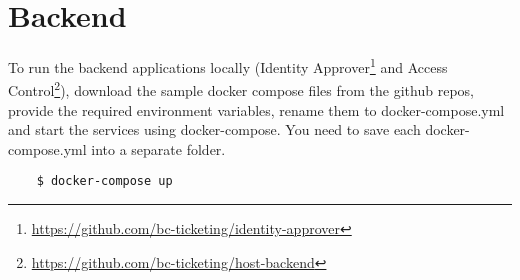 \section{Backend}
To run the backend applications locally (Identity Approver\footnote{\url{https://github.com/bc-ticketing/identity-approver}} and Access Control\footnote{\url{https://github.com/bc-ticketing/host-backend}}), download the sample docker compose files from the github repos, provide the required environment variables, rename them to docker-compose.yml and start the services using docker-compose. You need to save each docker-compose.yml into a separate folder.

\begin{lstlisting}
    $ docker-compose up
\end{lstlisting}